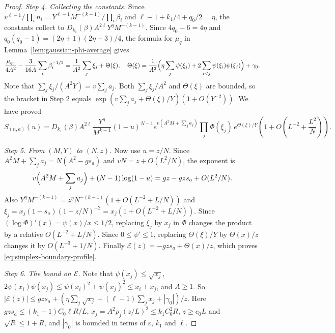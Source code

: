 \begin{proof}
\emph{Step 4. Collecting the constants.} Since
$v^{\ell-1}/\prod_in_i=Y^{\ell-1}M^{-(k-1)}/\prod_i\beta_i$ and
$\ell-1+k_1/4+q_0/2=\eta$, the constants collect to
$D_{k_1}(\beta)A^{2\ell}Y^\eta M^{-(k-1)}$. Since $4q_0-6=4\eta$ and
$q_0(q_0-1)=(2\eta+1)(2\eta+3)/4$, the formula for $\mu_q$ in
Lemma~\ref{lem:gaussian-phi-average} gives
\[
\frac{\mu_{q_0}}{4A^2}-\frac{3}{16A}\sum_i\beta_i^{-1/2}
=\frac1{A^2}\sum_j\xi_j+\Theta(\xi),\quad
\Theta(\xi)=\frac1{A^2}\Bigl(\eta\sum_j\psi(\xi_j)
+2\sum_{i<j}\psi(\xi_i)\psi(\xi_j)\Bigr)+\gamma_0.
\]
Note that $\sum_j\xi_j/(A^2Y)=v\sum_ja_j$. Both $\sum_j\xi_j/A^2$ and
$\Theta(\xi)$ are bounded, so the bracket in Step 2 equals
$\exp(v\sum_ja_j+\Theta(\xi)/Y)(1+O(Y^{-2}))$. We have proved
\begin{equation}\label{eq:simplex-boundary-M-form}
S_{(n,a)}(u)=D_{k_1}(\beta)A^{2\ell}\frac{Y^\eta}{M^{k-1}}(1-u)^{N-1}
e^{v(A^2M+\sum_ja_j)}\prod_j\Phi(\xi_j)\,e^{\Theta(\xi)/Y}
\left(1+O\!\left(L^{-2}+\frac{L^2}{N}\right)\right).
\end{equation}

\emph{Step 5. From $(M,Y)$ to $(N,z)$.} Now use $u=z/N$. Since
$A^2M+\sum_ja_j=N(A^2-gs_a)$ and $vN=z+O(L^2/N)$, the exponent is
\[
v\Bigl(A^2M+\sum_ja_j\Bigr)+(N-1)\log(1-u)=gz-gzs_a+O(L^2/N).
\]
Also $Y^\eta M^{-(k-1)}=z^\eta N^{-(k-1)}(1+O(L^{-2}+L/N))$ and
$\xi_j=x_j(1-s_a)(1-z/N)^{-2}=x_j(1+O(L^{-2}+L/N))$. Since
$(\log\Phi)'(x)=\psi(x)/x\le1/2$, replacing $\xi_j$ by $x_j$ in $\Phi$
changes the product by a relative $O(L^{-2}+L/N)$. Since
$0\le\psi'\le1$, replacing $\Theta(\xi)/Y$ by $\Theta(x)/z$ changes it by
$O(L^{-3}+1/N)$. Finally $\mathcal E(z)=-gzs_a+\Theta(x)/z$, which proves
\eqref{eq:simplex-boundary-profile}.

\emph{Step 6. The bound on $\mathcal E$.} Note that $\psi(x_j)\le\sqrt{x_j}$,
$2\psi(x_i)\psi(x_j)\le\psi(x_i)^2+\psi(x_j)^2\le x_i+x_j$, and $A\ge1$. So
$|\mathcal E(z)|\le gzs_a+(\eta\sum_j\sqrt{x_j}+(\ell-1)\sum_jx_j+|\gamma_0|)/z$.
Here $gzs_a\le(k_1-1)C_0\ell R/L$, $x_j=A^2\rho_j(z/L)^2\le k_1C_0^2R$,
$z\ge c_0L$ and $\sqrt R\le1+R$, and $|\gamma_0|$ is bounded in terms of
$\varepsilon$, $k_1$ and $\ell$.


\end{proof}
